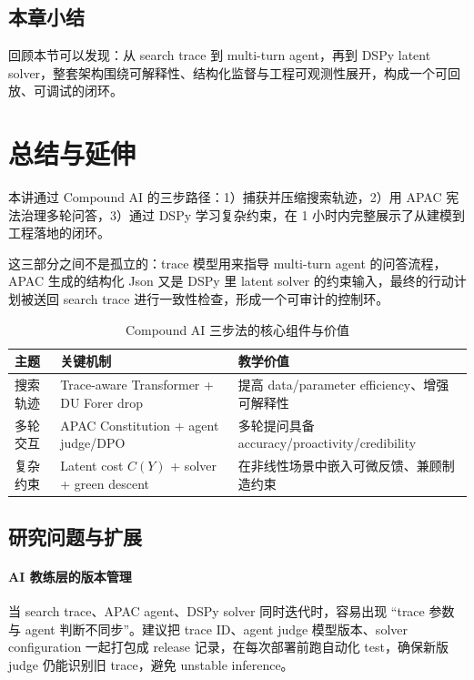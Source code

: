 \documentclass[a4paper]{article}
\begin{document}
\subsection{本章小结}
回顾本节可以发现：从 search trace 到 multi-turn agent，再到 DSPy latent solver，整套架构围绕可解释性、结构化监督与工程可观测性展开，构成一个可回放、可调试的闭环。

\section{总结与延伸}

本讲通过 Compound AI 的三步路径：1）捕获并压缩搜索轨迹，2）用 APAC 宪法治理多轮问答，3）通过 DSPy 学习复杂约束，在 1 小时内完整展示了从建模到工程落地的闭环。

这三部分之间不是孤立的：trace 模型用来指导 multi-turn agent 的问答流程，APAC 生成的结构化 Json 又是 DSPy 里 latent solver 的约束输入，最终的行动计划被送回 search trace 进行一致性检查，形成一个可审计的控制环。

\begin{table}[H]
\centering
\begin{tabular}{lp{5cm}p{6cm}}
\toprule
主题 & 关键机制 & 教学价值 \\
\midrule
搜索轨迹 & Trace-aware Transformer + DU Forer drop & 提高 data/parameter efficiency、增强可解释性 \\
多轮交互 & APAC Constitution + agent judge/DPO & 多轮提问具备 accuracy/proactivity/credibility \\
复杂约束 & Latent cost \(C(Y)\) + solver + green descent & 在非线性场景中嵌入可微反馈、兼顾制造约束 \\
\bottomrule
\end{tabular}
\caption{Compound AI 三步法的核心组件与价值}
\end{table}

\subsection{研究问题与扩展}

\paragraph{AI 教练层的版本管理}
当 search trace、APAC agent、DSPy solver 同时迭代时，容易出现 ``trace 参数与 agent 判断不同步''。建议把 trace ID、agent judge 模型版本、solver configuration 一起打包成 release 记录，在每次部署前跑自动化 test，确保新版 judge 仍能识别旧 trace，避免 unstable inference。
\end{document}
